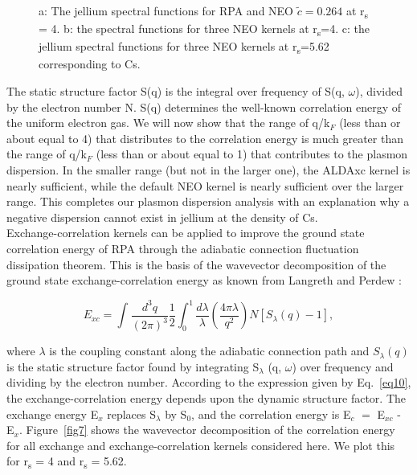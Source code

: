 \documentclass[aps,amsmath,amssymb, preprint, 12pt]{revtex4-1}
\begin{document}
\begin{figure}[h!]
	\caption{a: The jellium spectral functions for RPA and NEO\textbf{  \( \widetilde{c}=0.264 \) } at r\textsubscript{s }= 4. b: the spectral functions for three NEO kernels at r\textsubscript{s}=4. c: the jellium spectral functions for three NEO kernels at r\textsubscript{s}=5.62 corresponding to Cs.}
	\label{fig6}
\end{figure}






The static structure factor S(q) is the integral over frequency of S(q, $\omega$), divided by the electron number N. S(q) determines the well-known correlation energy of the uniform electron gas. We will now show that the range of q/k$_F$ (less than or about equal to 4) that distributes to the correlation energy is much greater than the range of q/k$_F$ (less than or about equal to 1) that contributes to the plasmon dispersion. In the smaller range (but not in the larger one), the ALDAxc kernel is nearly sufficient, while the default NEO kernel is nearly sufficient over the larger range. This completes our plasmon dispersion analysis with an explanation why a negative dispersion cannot exist in jellium at the density of Cs.\\ 


Exchange-correlation kernels can be applied to improve the ground state correlation energy of RPA through the adiabatic connection fluctuation dissipation theorem. This is the basis of the wavevector decomposition of the ground state exchange-correlation energy as known from Langreth and Perdew \cite{LP77}:

\begin{equation}
 E_{xc}= \int _{}^{}\frac{d^{3}q}{ ( 2 \pi ) ^{3}}\frac{1}{2} \int _{0}^{1}\frac{d \lambda }{ \lambda } ( \frac{4 \pi  \lambda }{q^{2}} ) N [ S_{ \lambda } ( {q} ) -1 ],
 \label{eq10}
\end{equation}

\noindent where $ \lambda $  is the coupling constant along the adiabatic connection path and  \( S_{ \lambda } \left( {q} \right)  \)  is the static structure factor found by integrating S$_\lambda$ (q, $\omega$) over frequency and dividing by the electron number. According to the expression given by Eq.~\ref{eq10}, the exchange-correlation energy depends upon the dynamic structure factor. The exchange energy E$_x$ replaces S$_\lambda$ by S$_0$, and the correlation energy is E$_c$ $=$ E$_{xc}$ - E$_x$. Figure~\ref{fig7} shows the wavevector decomposition of the correlation energy for all exchange and exchange-correlation kernels considered here. We plot this for r\textsubscript{s} = 4 and r\textsubscript{s} = 5.62.\\ 
\end{document}
